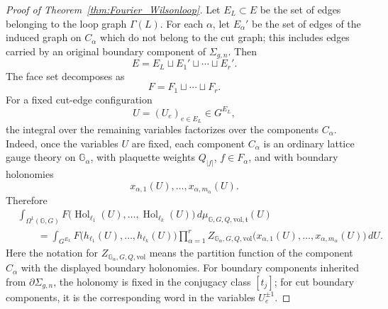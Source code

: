 \documentclass[11pt,a4paper,reqno]{article}
\theoremstyle{definition}
\theoremstyle{remark}
\begin{document}
\begin{proof}[Proof of Theorem~\ref{thm:Fourier_Wilsonloop}]
Let $E_L\subset E$ be the set of edges belonging to the loop graph $\Gamma(L)$. For each $\alpha$, let $E_\alpha'$ be the set of edges of the induced graph on $C_\alpha$ which do not belong to the cut graph; this includes edges carried by an original boundary component of $\Sigma_{g,n}$. Then
\[
 E=E_L\sqcup E_1'\sqcup\cdots\sqcup E_r'.
\] The face set decomposes as
\[
 F=F_1\sqcup\cdots\sqcup F_r .
\]
For a fixed cut-edge configuration
\[
 U=(U_e)_{e\in E_L}\in G^{E_L},
\]
the integral over the remaining variables factorizes over the components $C_\alpha$. Indeed, once the variables $U$ are fixed, each component $C_\alpha$ is an ordinary lattice gauge theory on $\mathbb G_\alpha$, with plaquette weights $Q_{|f|}$, $f\in F_\alpha$, and with boundary holonomies
\[
 x_{\alpha,1}(U),\ldots,x_{\alpha,m_\alpha}(U).
\]
Therefore
\[
\begin{aligned}
&\int_{\Omega^1(\mathbb G,G)}
 F\bigl(\operatorname{Hol}_{\ell_1}(U),\ldots,
 \operatorname{Hol}_{\ell_k}(U)\bigr)\,
 d\mu_{\mathbb G,G,Q,\mathrm{vol},\mathfrak t}(U) \\
&\qquad =
\int_{G^{E_L}}
 F\bigl(h_{\ell_1}(U),\ldots,h_{\ell_k}(U)\bigr)
 \prod_{\alpha=1}^r
 Z_{\mathbb G_\alpha,G,Q,\mathrm{vol}}
 \bigl(x_{\alpha,1}(U),\ldots,x_{\alpha,m_\alpha}(U)\bigr)
 \,dU .
\end{aligned}
\]
Here the notation for $Z_{\mathbb G_\alpha,G,Q,\mathrm{vol}}$ means the partition function of the component $C_\alpha$ with the displayed boundary holonomies. For boundary components inherited from $\partial\Sigma_{g,n}$, the holonomy is fixed in the conjugacy class $[t_j]$; for cut boundary components, it is the corresponding word in the variables $U_e^{\pm1}$.


\end{proof}
\end{document}
